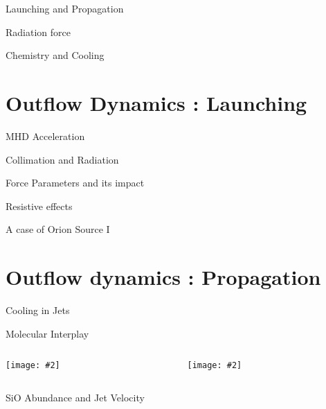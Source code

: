 \documentclass[8pt,xcolor=dvipsnames]{beamer}
\newcommand{\figpath}{/home/phybva/SiOJets_New/TALK/NEWFIGS}
\newcommand{\spic}[2]{\texttt{[image: \#2]}}
\begin{document}
\begin{frame}{Launching and Propagation}
\end{frame}

\begin{frame}{Radiation force}
\end{frame}

\begin{frame}{Chemistry and Cooling}
\end{frame}

\section{Outflow Dynamics : Launching}
\begin{frame}{MHD Acceleration}
\end{frame}

\begin{frame}{Collimation and Radiation}
\end{frame}

\begin{frame}{Force Parameters and its impact}
\end{frame}

\begin{frame}{Resistive effects}
\end{frame}

\begin{frame}{A case of Orion Source I}
\end{frame}

\section{Outflow dynamics : Propagation}
\begin{frame}{Cooling in Jets}
\end{frame}
\begin{frame}{Molecular Interplay}
\begin{columns}
\begin{column}{0.4\textwidth}
\spic{0.2}{\figpath/pfig6.pdf}
\end{column}
\hfill
\begin{column}{0.6\textwidth}
\spic{0.2}{\figpath/pfig7.pdf}
\end{column}
\end{columns}
\end{frame}

\begin{frame}{SiO Abundance and Jet Velocity}
\end{frame}
\end{document}
